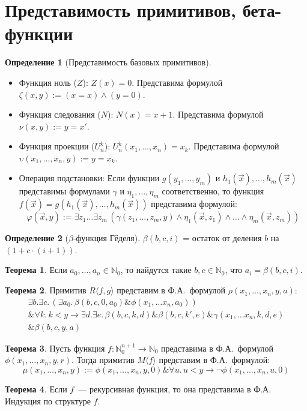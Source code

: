 \documentclass[a4paper,11pt]{article}
\theoremstyle{definition}
\newtheorem*{thm}{Теорема}
\newtheorem*{dfn}{Определение}
\newcommand{\amp}{\mathbin{\&}}
\newcommand{\Rr}[1]{R\langle #1\rangle}
\newcommand{\Mn}[1]{M\langle #1\rangle}
\begin{document}
\section{Представимость примитивов, бета-функции}
\begin{dfn}[Представимость базовых примитивов]
\begin{itemize}
\item Функция ноль ($Z$): $Z(x) = 0$. Представима формулой $\zeta(x, y) := (x =
  x) \wedge (y = 0)$.
\item Функция следования ($N$): $N(x) = x + 1$. Представима формулой $\nu(x, y)
  := y = x'$.
\item Функция проекции ($U^k_n$): $U^k_n(x_1, \dots, x_n) = x_k$. Представима
  формулой $\upsilon(x_1, \dots, x_n, y) := y = x_k$.
\item Операция подстановки: Если функции $g(y_1, \dots, y_m)$ и $h_1(\vec x),
  \dots, h_m(\vec x)$ представимы формулами $\gamma$ и $\eta_1, \dots, \eta_m$
  соответственно, то функция $f(\vec x) = g(h_1(\vec x), \dots, h_m(\vec x))$
  представима формулой:
  \[
  \varphi(\vec x, y) := \exists z_1 \dots \exists z_m\,(\gamma(z_1, \dots, z_m, y) \wedge \eta_1(\vec x, z_1) \wedge \dots \wedge \eta_m(\vec x, z_m))
  \]
\end{itemize}
\end{dfn}
\begin{dfn}[$\beta$-функция Гёделя]
$\beta(b, c, i)$ = остаток от деления $b$ на $(1 + c \cdot (i + 1))$.
\end{dfn}
\begin{thm}
Если $a_0, \dots, a_n \in \mathbb{N}_0$, то найдутся такие $b, c \in
\mathbb{N}_0$, что $a_i = \beta(b, c, i)$.
\end{thm}
\begin{thm}
Примитив $\Rr{f, g}$ представим в Ф.А.\ формулой $\rho(x_1, \dots, x_n, y, a)$:
\begin{multline*}
\exists b.\exists c.\,(\exists a_0.\,\beta(b, c, 0, a_0) \amp \phi(x_1, \dots x_n, a_0))\\
\amp \forall k.\,k < y \to \exists d.\exists e.\,\beta(b, c, k, d) \amp \beta(b, c, k', e) \amp \gamma(x_1, \dots x_n, k, d, e)\\
\amp \beta(b, c, y, a)
\end{multline*}
\end{thm}
\begin{thm}
Пусть функция $f : \mathbb{N}_0^{n+1} \to \mathbb{N}_0$ представима в Ф.А.\
формулой $\phi(x_1, \dots, x_n, y, r)$. Тогда примитив $\Mn{f}$ представим в
Ф.А.\ формулой:
\[
\mu(x_1, \dots, x_n, y) := \phi(x_1, \dots, x_n, y, 0) \amp \forall u.\,u < y \to \neg\phi(x_1, \dots, x_n, u, 0)
\]
\end{thm}
\begin{thm}
Если $f$~--- рекурсивная функция, то она представима в Ф.А. Индукция по
структуре $f$.
\end{thm}
\end{document}
